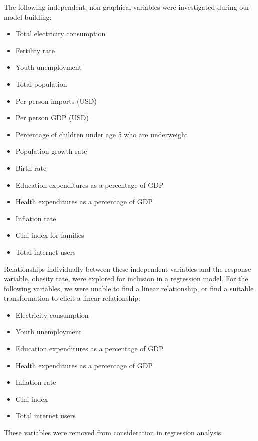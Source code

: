 \documentclass[oneside,12pt]{report}
\begin{document}
The following independent, non-graphical variables were investigated during our model building:
\begin{itemize}
\item Total electricity consumption
\item Fertility rate
\item Youth unemployment
\item Total population
\item Per person imports (USD)
\item Per person GDP (USD)
\item Percentage of children under age 5 who are underweight
\item Population growth rate
\item Birth rate
\item Education expenditures as a percentage of GDP
\item Health expenditures as a percentage of GDP
\item Inflation rate
\item Gini index for families
\item Total internet users
\end{itemize}

Relationships individually between these independent variables and the response variable, obesity rate, were explored for inclusion in a regression model. For the following variables, we were unable to find a linear relationship, or find a suitable transformation to elicit a linear relationship:

\begin{itemize}
\item Electricity consumption
\item Youth unemployment
\item Education expenditures as a percentage of GDP
\item Health expenditures as a percentage of GDP
\item Inflation rate
\item Gini index
\item Total internet users
\end{itemize}

\noindent These variables were removed from consideration in regression analysis.
\end{document}
